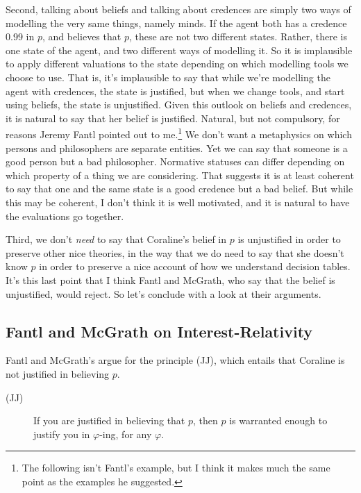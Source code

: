 Second, talking about beliefs and talking about credences are simply two ways of modelling the very same things, namely minds. If the agent both has a credence 0.99 in $p$, and believes that $p$, these are not two different states. Rather, there is one state of the agent, and two different ways of modelling it. So it is implausible to apply different valuations to the state depending on which modelling tools we choose to use. That is, it's implausible to say that while we're modelling the agent with credences, the state is justified, but when we change tools, and start using beliefs, the state is unjustified. Given this outlook on beliefs and credences, it is natural to say that her belief is justified. Natural, but not compulsory, for reasons Jeremy Fantl pointed out to me.\footnote{The following isn't Fantl's example, but I think it makes much the same point as the examples he suggested.} We don't want a metaphysics on which persons and philosophers are separate entities. Yet we can say that someone is a good person but a bad philosopher. Normative statuses can differ depending on which property of a thing we are considering. That suggests it is at least coherent to say that one and the same state is a good credence but a bad belief. But while this may be coherent, I don't think it is well motivated, and it is natural to have the evaluations go together.

Third, we don't \textit{need} to say that Coraline's belief in $p$ is unjustified in order to preserve other nice theories, in the way that we do need to say that she doesn't know $p$ in order to preserve a nice account of how we understand decision tables. It's this last point that I think Fantl and McGrath, who say that the belief is unjustified, would reject. So let's conclude with a look at their arguments.

\subsection{Fantl and McGrath on Interest-Relativity}

Fantl and McGrath's argue for the principle (JJ), which entails that Coraline is not justified in believing $p$.

\begin{description}
\item[(JJ)] If you are justified in believing that $p$, then $p$ is warranted enough to justify you in $\varphi$-ing, for any $\varphi$. \cite[99]{FantlMcGrath2009}
\end{description}

